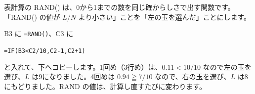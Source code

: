 \par\vspace{4pt}
\noindent\begin{minipage}[c]{0.5\linewidth}\centering
{}
\label{ph:熱-15:tab-sheet}
\end{minipage}\hfill
\begin{minipage}[c]{0.46\linewidth}\raggedright
表計算の RAND() は、0から1までの数を同じ確からしさで出す関数です。「RAND() の値が $L/N$ より小さい」ことを「左の玉を選んだ」ことにします。\par\vspace{3pt}
B3 に \texttt{=RAND()}、C3 に\par
\texttt{=IF(B3<C2/10,C2-1,C2+1)}\par
と入れて、下へコピーします。1回め（3行め）は、$0.11<10/10$ なので左の玉を選び、$L$ は9になりました。4回めは $0.94\geqq7/10$ なので、右の玉を選び、$L$ は8にもどりました。RAND の値は、計算し直すたびに変わります。
\end{minipage}

